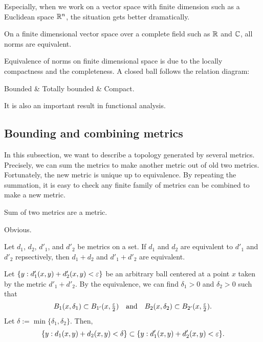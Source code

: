 \documentclass{../crs}
\begin{document}
Especially, when we work on a vector space with finite dimension such as a Euclidean space $\mathbb{R}^n$, the situation gets better dramatically.

\begin{thm}
On a finite dimensional vector space over a complete field such as $\mathbb{R}$ and $\mathbb{C}$, all norms are equivalent.
\end{thm}
\begin{pf}
\end{pf}

\begin{rmk}
Equivalence of norms on finite dimensional space is due to the locally compactness and the completeness.
A closed ball follows the relation diagram:
\begin{rd}
Bounded  & Totally bounded  & Compact.
\end{rd}
It is also an important result in functional analysis.
\end{rmk}

\subsection{Bounding and combining metrics}

In this subsection, we want to describe a topology generated by several metrics.
Precisely, we can sum the metrics to make another metric out of old two metrics.
Fortunately, the new metric is unique up to equivalence.
By repeating the summation, it is easy to check any finite family of metrics can be combined to make a new metric.

\begin{prop}
Sum of two metrics are a metric.
\end{prop}
\begin{pf}
Obvious.
\end{pf}
\begin{prop}
Let $d_1$, $d_2$, $d'_1$, and $d'_2$ be metrics on a set.
If $d_1$ and $d_2$ are equivalent to $d'_1$ and $d'_2$ repsectively, then $d_1+d_2$ and $d'_1+d'_2$ are equivalent.
\end{prop}
\begin{pf}
Let $\{y:d'_1(x,y)+d'_2(x,y)<\varepsilon\}$ be an arbitrary ball centered at a point $x$ taken by the metric $d'_1+d'_2$.
By the equivalence, we can find $\delta_1>0$ and $\delta_2>0$ such that
\[B_1(x,\delta_1)\subset B_{1'}(x,\tfrac{\varepsilon}2)\quad\text{and}\quad B_2(x,\delta_2)\subset B_{2'}(x,\tfrac{\varepsilon}2).\]
Let $\delta:=\min\{\delta_1,\delta_2\}$.
Then,
\[\{y:d_1(x,y)+d_2(x,y)<\delta\}\subset\{y:d'_1(x,y)+d'_2(x,y)<\varepsilon\}.\]
\end{pf}
\end{document}
